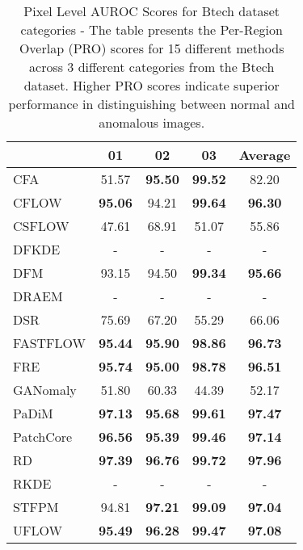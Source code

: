 \begin{table}[h!]
    \centering
    \captionsetup{justification=raggedright}
        \begin{tabular}{l*{4}{c}}
        \toprule
         & 01 & 02 & 03 & Average \\
        \midrule
        CFA & 51.57 & \textbf{95.50} & \textbf{99.52} & 82.20 \\
        CFLOW & \textbf{95.06} & 94.21 & \textbf{99.64} & \textbf{96.30} \\
        CSFLOW & 47.61 & 68.91 & 51.07 & 55.86 \\
        DFKDE & - & - & - & - \\
        DFM & 93.15 & 94.50 & \textbf{99.34} & \textbf{95.66} \\
        DRAEM & - & - & - & - \\
        DSR & 75.69 & 67.20 & 55.29 & 66.06 \\
        FASTFLOW & \textbf{95.44} & \textbf{95.90} & \textbf{98.86} & \textbf{96.73} \\
        FRE & \textbf{95.74} & \textbf{95.00} & \textbf{98.78} & \textbf{96.51} \\
        GANomaly & 51.80 & 60.33 & 44.39 & 52.17 \\
        PaDiM & \textbf{97.13} & \textbf{95.68} & \textbf{99.61} & \textbf{97.47} \\
        PatchCore & \textbf{96.56} & \textbf{95.39} & \textbf{99.46} & \textbf{97.14} \\
        RD & \textbf{97.39} & \textbf{96.76} & \textbf{99.72} & \textbf{97.96} \\
        RKDE & - & - & - & - \\
        STFPM & 94.81 & \textbf{97.21} & \textbf{99.09} & \textbf{97.04} \\
        UFLOW & \textbf{95.49} & \textbf{96.28} & \textbf{99.47} & \textbf{97.08} \\
        \bottomrule
        \end{tabular}
    \caption{Pixel Level AUROC Scores for Btech\cite{Bergmann_2022_mvtec3d} dataset categories - The table presents the Per-Region Overlap (PRO) scores for 15 different methods across 3 different categories from the Btech dataset. Higher PRO scores indicate superior performance in distinguishing between normal and anomalous images.}
    \label{table:Btech Pixel AUROC}
\end{table}